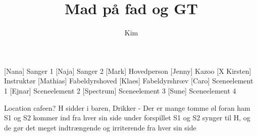 \documentclass[a4paper,11pt]{article}
\title{Mad på fad og GT}
\author{Kim}
\begin{document}
  \maketitle

  \begin{roles}
    [Nana] Sanger 1
    [Naja] Sanger 2
    [Mark] Hovedperson
    [Jenny] Kazoo
	[X Kirsten] Instruktør
    [Mathias] Fabeldyrshoved
    [Klaes] Fabeldyrshr\oe v
    [Caro] Sceneelement 1
    [Ejnar] Sceneelement 2
    [Spectrum] Sceneelement 3
    [Sune] Sceneelement 4
  \end{roles}

  \scene Location cafeen? H sidder i baren, Drikker - Der er mange tomme øl foran ham
  \scene S1 og S2 kommer ind fra hver sin side under forspillet
  \scene S1 og S2 synger til H, og de gør det meget indtrængende og irriterende fra hver sin side
\end{document}
